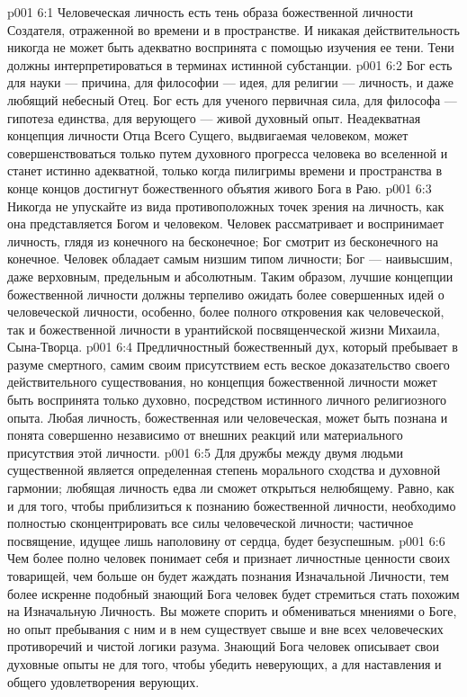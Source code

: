 \vs p001 6:1 Человеческая личность есть тень образа божественной личности Создателя, отраженной во времени и в пространстве. И никакая действительность никогда не может быть адекватно воспринята с помощью изучения ее тени. Тени должны интерпретироваться в терминах истинной субстанции.
\vs p001 6:2 \pc Бог есть для науки --- причина, для философии --- идея, для религии --- личность, и даже любящий небесный Отец. Бог есть для ученого первичная сила, для философа --- гипотеза единства, для верующего --- живой духовный опыт. Неадекватная концепция личности Отца Всего Сущего, выдвигаемая человеком, может совершенствоваться только путем духовного прогресса человека во вселенной и станет истинно адекватной, только когда пилигримы времени и пространства в конце концов достигнут божественного объятия живого Бога в Раю.
\vs p001 6:3 Никогда не упускайте из вида противоположных точек зрения на личность, как она представляется Богом и человеком. Человек рассматривает и воспринимает личность, глядя из конечного на бесконечное; Бог смотрит из бесконечного на конечное. Человек обладает самым низшим типом личности; Бог --- наивысшим, даже верховным, предельным и абсолютным. Таким образом, лучшие концепции божественной личности должны терпеливо ожидать более совершенных идей о человеческой личности, особенно, более полного откровения как человеческой, так и божественной личности в урантийской посвященческой жизни Михаила, Сына\hyp{}Творца.
\vs p001 6:4 \pc Предличностный божественный дух, который пребывает в разуме смертного, самим своим присутствием есть веское доказательство своего действительного существования, но концепция божественной личности может быть воспринята только духовно, посредством истинного личного религиозного опыта. Любая личность, божественная или человеческая, может быть познана и понята совершенно независимо от внешних реакций или материального присутствия этой личности.
\vs p001 6:5 Для дружбы между двумя людьми существенной является определенная степень морального сходства и духовной гармонии; любящая личность едва ли сможет открыться нелюбящему. Равно, как и для того, чтобы приблизиться к познанию божественной личности, необходимо полностью сконцентрировать все силы человеческой личности; частичное посвящение, идущее лишь наполовину от сердца, будет безуспешным.
\vs p001 6:6 Чем более полно человек понимает себя и признает личностные ценности своих товарищей, чем больше он будет жаждать познания Изначальной Личности, тем более искренне подобный знающий Бога человек будет стремиться стать похожим на Изначальную Личность. Вы можете спорить и обмениваться мнениями о Боге, но опыт пребывания с ним и в нем существует свыше и вне всех человеческих противоречий и чистой логики разума. Знающий Бога человек описывает свои духовные опыты не для того, чтобы убедить неверующих, а для наставления и общего удовлетворения верующих.
